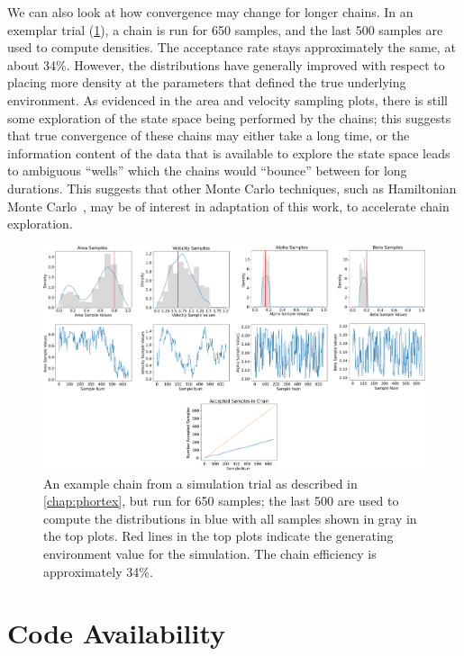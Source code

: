 We can also look at how convergence may change for longer chains. In an exemplar trial (\cref{fig:phumes_long_chain}), a chain is run for 650 samples, and the last 500 samples are used to compute densities. The acceptance rate stays approximately the same, at about 34\%. However, the distributions have generally improved with respect to placing more density at the parameters that defined the true underlying environment. As evidenced in the area and velocity sampling plots, there is still some exploration of the state space being performed by the chains; this suggests that true convergence of these chains may either take a long time, or the information content of the data that is available to explore the state space leads to ambiguous ``wells'' which the chains would ``bounce'' between for long durations. This suggests that other Monte Carlo techniques, such as Hamiltonian Monte Carlo~\autocite{duane1987hybrid}, may be of interest in adaptation of this work, to accelerate chain exploration.

\begin{figure}[h!]
    \centering
    \includegraphics[width=1\columnwidth]{figures/phumes_long_chain.png}
    \caption[\PHUMES long chain]{An example chain from a simulation trial as described in \cref{chap:phortex}, but run for 650 samples; the last 500 are used to compute the distributions in blue with all samples shown in gray in the top plots. Red lines in the top plots indicate the generating environment value for the simulation. The chain efficiency is approximately 34\%.}
    \label{fig:phumes_long_chain}
\end{figure}

\section{Code Availability}
